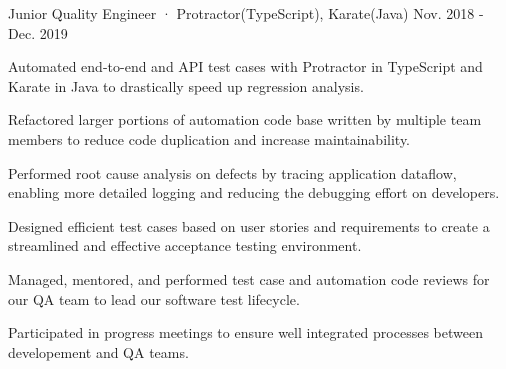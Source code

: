 \begin{cventries}
\cventry
  {Junior Quality Engineer · Protractor(TypeScript), Karate(Java)} %
  {} %
  {} %
  {Nov. 2018 - Dec. 2019} %
  {
    \begin{cvitems} %
      \item {Automated end-to-end and API test cases with Protractor in TypeScript and Karate in Java to drastically speed up regression analysis.}
      \item {Refactored larger portions of automation code base written by multiple team members to reduce code duplication and increase maintainability.}
      \item {Performed root cause analysis on defects by tracing application dataflow, enabling more detailed logging and reducing the debugging effort on developers.}
      \item {Designed efficient test cases based on user stories and requirements to create a streamlined and effective acceptance testing environment.}
      \item {Managed, mentored, and performed test case and automation code reviews for our QA team to lead our software test lifecycle.}
      \item {Participated in progress meetings to ensure well integrated processes between developement and QA teams.}
    \end{cvitems}
  }


\end{cventries}
